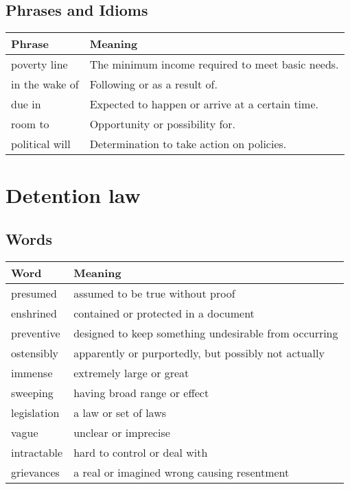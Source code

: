 \documentclass{article}%
\begin{document}
%
\subsection{Phrases and Idioms}%
\label{subsec:PhrasesandIdioms}%
\begin{tabular}{ll}%
Phrase&Meaning\\%
\hline%
poverty line&The minimum income required to meet basic needs.\\%
in the wake of&Following or as a result of.\\%
due in&Expected to happen or arrive at a certain time.\\%
room to&Opportunity or possibility for.\\%
political will&Determination to take action on policies.\\%
\end{tabular}

%
\section{Detention law}%
\label{sec:Detentionlaw}%
\subsection{Words}%
\label{subsec:Words}%
\begin{tabular}{ll}%
Word&Meaning\\%
\hline%
presumed&assumed to be true without proof\\%
enshrined&contained or protected in a document\\%
preventive&designed to keep something undesirable from occurring\\%
ostensibly&apparently or purportedly, but possibly not actually\\%
immense&extremely large or great\\%
sweeping&having broad range or effect\\%
legislation&a law or set of laws\\%
vague&unclear or imprecise\\%
intractable&hard to control or deal with\\%
grievances&a real or imagined wrong causing resentment\\%
\end{tabular}

%
\end{document}
